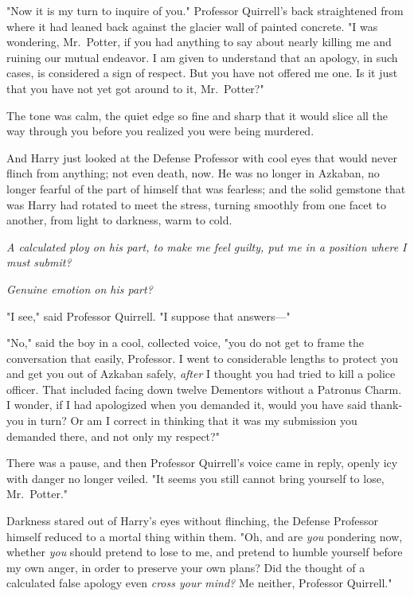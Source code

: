 "Now it is my turn to inquire of you." Professor Quirrell's back straightened
from where it had leaned back against the glacier wall of painted concrete. "I
was wondering, Mr.~Potter, if you had anything to say about nearly killing me
and ruining our mutual endeavor. I am given to understand that an apology, in
such cases, is considered a sign of respect. But you have not offered me one.
Is it just that you have not yet got around to it, Mr.~Potter?"

The tone was calm, the quiet edge so fine and sharp that it would slice all the
way through you before you realized you were being murdered.

And Harry just looked at the Defense Professor with cool eyes that would never
flinch from anything; not even death, now. He was no longer in Azkaban, no
longer fearful of the part of himself that was fearless; and the solid gemstone
that was Harry had rotated to meet the stress, turning smoothly from one facet
to another, from light to darkness, warm to cold.

\emph{A calculated ploy on his part, to make me feel guilty, put me in a
position where I must submit?}

\emph{Genuine emotion on his part?}

"I see," said Professor Quirrell. "I suppose that answers---"

"No," said the boy in a cool, collected voice, "you do not get to frame the
conversation that easily, Professor. I went to considerable lengths to protect
you and get you out of Azkaban safely, \emph{after} I thought you had tried to
kill a police officer. That included facing down twelve Dementors without a
Patronus Charm. I wonder, if I had apologized when you demanded it, would you
have said thank-you in turn? Or am I correct in thinking that it was my
submission you demanded there, and not only my respect?"

There was a pause, and then Professor Quirrell's voice came in reply, openly
icy with danger no longer veiled. "It seems you still cannot bring yourself to
lose, Mr.~Potter."

Darkness stared out of Harry's eyes without flinching, the Defense Professor
himself reduced to a mortal thing within them. "Oh, and are \emph{you}
pondering now, whether \emph{you} should pretend to lose to me, and pretend to
humble yourself before my own anger, in order to preserve your own plans? Did
the thought of a calculated false apology even \emph{cross your mind?} Me
neither, Professor Quirrell."

